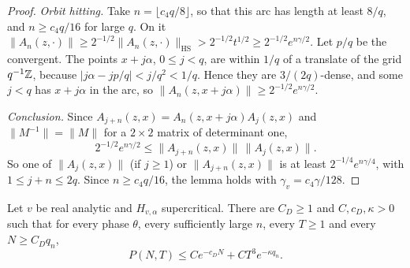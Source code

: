 \begin{proof}
\emph{Orbit hitting.} Take $n=\lfloor c_4q/8\rfloor$, so that this arc has length at least $8/q$, and $n\ge c_4q/16$ for large $q$. On it $\|A_n(z,\cdot)\|\ge2^{-1/2}\|A_n(z,\cdot)\|_{\mathrm{HS}}>2^{-1/2}t^{1/2}\ge2^{-1/2}e^{n\gamma/2}$. Let $p/q$ be the convergent. The points $x+j\alpha$, $0\le j<q$, are within $1/q$ of a translate of the grid $q^{-1}\mathbb Z$, because $|j\alpha-jp/q|<j/q^2<1/q$. Hence they are $3/(2q)$-dense, and some $j<q$ has $x+j\alpha$ in the arc, so $\|A_n(z,x+j\alpha)\|\ge2^{-1/2}e^{n\gamma/2}$.

\emph{Conclusion.} Since $A_{j+n}(z,x)=A_n(z,x+j\alpha)A_j(z,x)$ and $\|M^{-1}\|=\|M\|$ for a $2\times2$ matrix of determinant one,
\[
2^{-1/2}e^{n\gamma/2}\le\|A_{j+n}(z,x)\|\,\|A_j(z,x)\|.
\]
So one of $\|A_j(z,x)\|$ (if $j\ge1$) or $\|A_{j+n}(z,x)\|$ is at least $2^{-1/4}e^{n\gamma/4}$, with $1\le j+n\le2q$. Since $n\ge c_4q/16$, the lemma holds with $\gamma_v=c_4\gamma/128$.
\end{proof}

\begin{theorem}\label{thm:tI-M1}
Let $v$ be real analytic and $H_{v,\alpha}$ supercritical. There are $C_D\ge1$ and $C,c_D,\kappa>0$ such that for every phase $\theta$, every sufficiently large $n$, every $T\ge1$ and every $N\ge C_Dq_n$,
\[
P(N,T)\le Ce^{-c_DN}+CT^3e^{-\kappa q_n}.
\]
\end{theorem}

